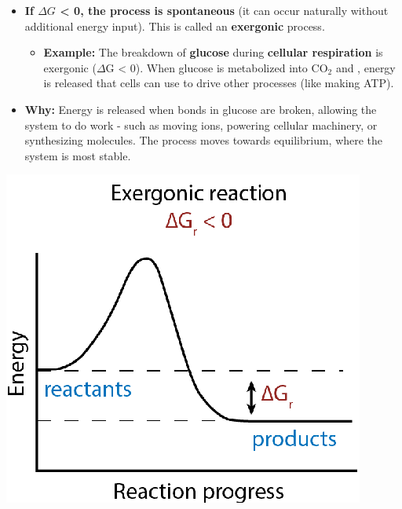 \documentclass[10pt]{article}
\newcommand{\water}{\text{H$_2$O}}
\begin{document}
\begin{itemize}
    \item \textbf{If $\Delta G$ < 0, the process is spontaneous} (it can occur naturally without additional energy input).  This is called an \textbf{exergonic} process.
    \begin{itemize}
        \item \textbf{Example:} The breakdown of \textbf{glucose} during \textbf{cellular respiration} is exergonic ($\Delta$G < 0).  When glucose is metabolized into CO$_2$ and \water, energy is released that cells can use to drive other processes (like making ATP).
    \end{itemize}
    \item \textbf{Why:} Energy is released when bonds in glucose are broken, allowing the system to do work - such as moving ions, powering cellular machinery, or synthesizing molecules.  The process moves towards equilibrium, where the system is most stable.
\end{itemize}
\begin{center}
    \includegraphics*[scale=0.9]{L3_10.png}
\end{center}
\end{document}
